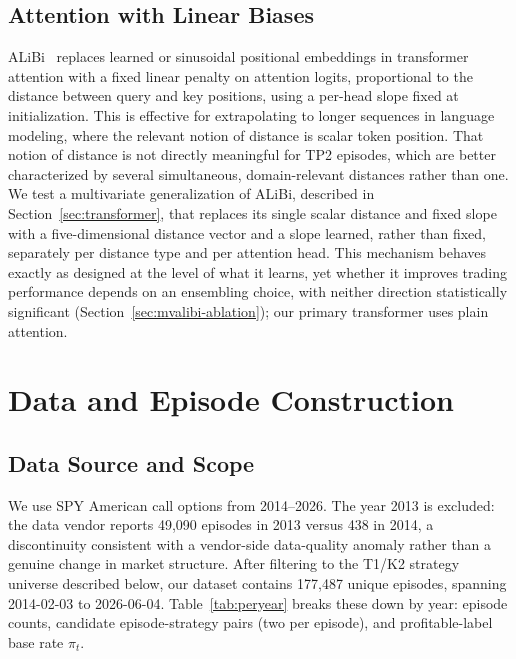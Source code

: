\documentclass[sigconf,review]{acmart}
\begin{document}
\subsection{Attention with Linear Biases}
ALiBi~\cite{press2022alibi} replaces learned or sinusoidal positional embeddings in transformer attention with a fixed linear penalty on attention logits, proportional to the distance between query and key positions, using a per-head slope fixed at initialization. This is effective for extrapolating to longer sequences in language modeling, where the relevant notion of distance is scalar token position. That notion of distance is not directly meaningful for TP2 episodes, which are better characterized by several simultaneous, domain-relevant distances rather than one. We test a multivariate generalization of ALiBi, described in Section~\ref{sec:transformer}, that replaces its single scalar distance and fixed slope with a five-dimensional distance vector and a slope learned, rather than fixed, separately per distance type and per attention head. This mechanism behaves exactly as designed at the level of what it learns, yet whether it improves trading performance depends on an ensembling choice, with neither direction statistically significant (Section~\ref{sec:mvalibi-ablation}); our primary transformer uses plain attention.

\section{Data and Episode Construction}
\label{sec:data}

\subsection{Data Source and Scope}
\label{sec:data-source}
We use SPY American call options from 2014--2026. The year 2013 is excluded: the data vendor reports 49{,}090 episodes in 2013 versus 438 in 2014, a discontinuity consistent with a vendor-side data-quality anomaly rather than a genuine change in market structure. After filtering to the T1/K2 strategy universe described below, our dataset contains 177{,}487 unique episodes, spanning 2014-02-03 to 2026-06-04. Table~\ref{tab:peryear} breaks these down by year: episode counts, candidate episode-strategy pairs (two per episode), and profitable-label base rate $\pi_t$.
\end{document}
